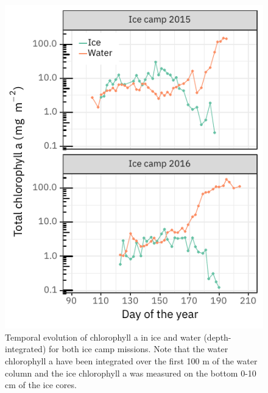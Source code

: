 \documentclass[12pt,a4paper]{scrartcl}
\begin{document}
\begin{figure}[h]
	\centering
	\includegraphics[scale = 2]{../../../graphs/fig7.pdf}
	\caption{Temporal evolution of chlorophyll a in ice and water (depth-integrated) for both ice camp missions. Note that the water chlorophyll a have been integrated over the first 100 m of the water column and the ice chlorophyll a was measured on the bottom 0-10 cm of the ice cores.}
\end{figure}
\end{document}
